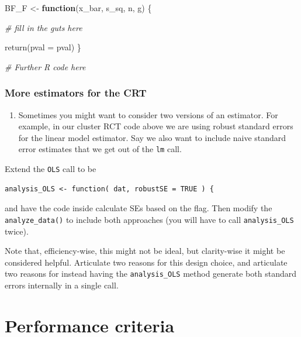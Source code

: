 \documentclass[
]{book}
\newenvironment{Shaded}{\begin{snugshade}}{\end{snugshade}}
\newcommand{\AttributeTok}[1]{\textcolor[rgb]{0.77,0.63,0.00}{#1}}
\newcommand{\CommentTok}[1]{\textcolor[rgb]{0.56,0.35,0.01}{\textit{#1}}}
\newcommand{\ControlFlowTok}[1]{\textcolor[rgb]{0.13,0.29,0.53}{\textbf{#1}}}
\newcommand{\FunctionTok}[1]{\textcolor[rgb]{0.00,0.00,0.00}{#1}}
\newcommand{\NormalTok}[1]{#1}
\newcommand{\OtherTok}[1]{\textcolor[rgb]{0.56,0.35,0.01}{#1}}
\providecommand{\tightlist}{%
  \setlength{\itemsep}{0pt}\setlength{\parskip}{0pt}}
\begin{document}
\begin{Shaded}
\begin{Highlighting}[]
\NormalTok{BF\_F }\OtherTok{\textless{}{-}} \ControlFlowTok{function}\NormalTok{(x\_bar, s\_sq, n, g) \{}
  
  \CommentTok{\# fill in the guts here}
  
  \FunctionTok{return}\NormalTok{(}\AttributeTok{pval =}\NormalTok{ pval)}
\NormalTok{\}}

\CommentTok{\# Further R code here}
\end{Highlighting}
\end{Shaded}

\hypertarget{more-estimators-for-the-crt}{%
\subsection{More estimators for the CRT}\label{more-estimators-for-the-crt}}

\begin{enumerate}
\def\labelenumi{\arabic{enumi}.}
\setcounter{enumi}{2}
\tightlist
\item
  Sometimes you might want to consider two versions of an estimator. For example, in our cluster RCT code above we are using robust standard errors for the linear model estimator. Say we also want to include naive standard error estimates that we get out of the \texttt{lm} call.
\end{enumerate}

Extend the \texttt{OLS} call to be

\begin{verbatim}
analysis_OLS <- function( dat, robustSE = TRUE ) {
\end{verbatim}

and have the code inside calculate SEs based on the flag. Then modify the \texttt{analyze\_data()} to include both approaches (you will have to call \texttt{analysis\_OLS} twice).

Note that, efficiency-wise, this might not be ideal, but clarity-wise it might be considered helpful. Articulate two reasons for this design choice, and articulate two reasons for instead having the \texttt{analysis\_OLS} method generate both standard errors internally in a single call.

\hypertarget{performance-criteria}{%
\chapter{Performance criteria}\label{performance-criteria}}
\end{document}
